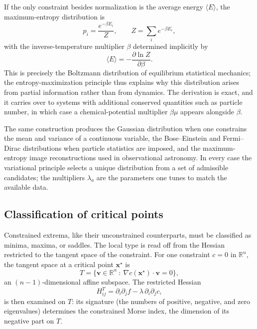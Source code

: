 \begin{example}
If the only constraint besides normalization is the average energy $\langle E\rangle$, the maximum-entropy distribution is
\begin{equation}
p_i=\frac{e^{-\beta E_i}}{Z},
\qquad
Z=\sum_i e^{-\beta E_i},
\end{equation}
with the inverse-temperature multiplier $\beta$ determined implicitly by
\begin{equation}
\langle E\rangle=-\frac{\partial\ln Z}{\partial\beta}.
\end{equation}
This is precisely the Boltzmann distribution of equilibrium statistical mechanics; the entropy-maximization principle thus explains why this distribution arises from partial information rather than from dynamics. The derivation is exact, and it carries over to systems with additional conserved quantities such as particle number, in which case a chemical-potential multiplier $\beta\mu$ appears alongside $\beta$.
\end{example}

The same construction produces the Gaussian distribution when one constrains the mean and variance of a continuous variable, the Bose--Einstein and Fermi--Dirac distributions when particle statistics are imposed, and the maximum-entropy image reconstructions used in observational astronomy. In every case the variational principle selects a unique distribution from a set of admissible candidates; the multipliers $\lambda_a$ are the parameters one tunes to match the available data.

\subsection{Classification of critical points}

Constrained extrema, like their unconstrained counterparts, must be classified as minima, maxima, or saddles. The local type is read off from the Hessian restricted to the tangent space of the constraint. For one constraint $c=0$ in $\mathbb{R}^n$, the tangent space at a critical point $\mathbf{x}^\star$ is
\begin{equation}
T=\bigl\{\mathbf{v}\in\mathbb{R}^n\ :\ \nabla c(\mathbf{x}^\star)\cdot\mathbf{v}=0\bigr\},
\end{equation}
an $(n-1)$-dimensional affine subspace. The restricted Hessian
\begin{equation}
H^{T}_{ij}=\partial_i\partial_j f-\lambda\,\partial_i\partial_j c,
\end{equation}
is then examined on $T$: its signature (the numbers of positive, negative, and zero eigenvalues) determines the constrained Morse index, the dimension of its negative part on $T$.

